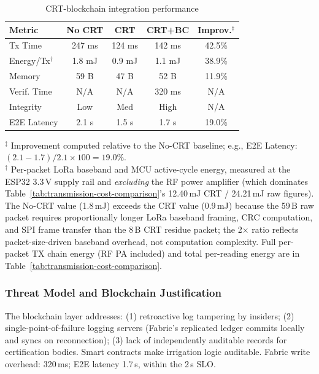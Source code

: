\documentclass[pdflatex,sn-mathphys-num]{sn-jnl}
\theoremstyle{thmstyleone}
\theoremstyle{thmstyletwo}
\theoremstyle{thmstylethree}
\begin{document}
\begin{table}[htbp]
\centering
\scriptsize
\caption{CRT-blockchain integration performance}
\label{tab:integration_performance}
\begin{tabular}{@{}lcccc@{}}
\toprule
\textbf{Metric} & \textbf{No CRT} & \textbf{CRT} & \textbf{CRT+BC} & \textbf{Improv.$^\ddagger$} \\
\midrule
Tx Time         & 247 ms & 124 ms & 142 ms & 42.5\% \\
Energy/Tx$^\dagger$       & 1.8 mJ & 0.9 mJ & 1.1 mJ & 38.9\% \\
Memory          & 59 B   & 47 B   & 52 B   & 11.9\% \\
Verif. Time     & N/A    & N/A    & 320 ms & N/A \\
Integrity       & Low    & Med    & High   & N/A \\
E2E Latency     & 2.1 s  & 1.5 s  & 1.7 s  & 19.0\% \\
\bottomrule
\end{tabular}
{\footnotesize $^\ddagger$ Improvement computed relative to the No-CRT baseline; e.g., E2E Latency: $(2.1-1.7)/2.1\times100=19.0\%$.\\
$^\dagger$ Per-packet LoRa baseband and MCU active-cycle energy, measured at the ESP32 3.3\,V supply rail and \emph{excluding} the RF power amplifier (which dominates Table~\ref{tab:transmission-cost-comparison}'s 12.40\,mJ CRT / 24.21\,mJ raw figures). The No-CRT value (1.8\,mJ) exceeds the CRT value (0.9\,mJ) because the 59\,B raw packet requires proportionally longer LoRa baseband framing, CRC computation, and SPI frame transfer than the 8\,B CRT residue packet; the 2$\times$ ratio reflects packet-size-driven baseband overhead, not computation complexity. Full per-packet TX chain energy (RF PA included) and total per-reading energy are in Table~\ref{tab:transmission-cost-comparison}.}
\end{table}

\subsubsection{Threat Model and Blockchain Justification}
\label{subsubsec:threat_model}

The blockchain layer addresses: (1) retroactive log tampering by insiders; (2) single-point-of-failure logging servers (Fabric's replicated ledger commits locally and syncs on reconnection); (3) lack of independently auditable records for certification bodies. Smart contracts make irrigation logic auditable. Fabric write overhead: 320\,ms; E2E latency 1.7\,s, within the 2\,s SLO.
\end{document}
